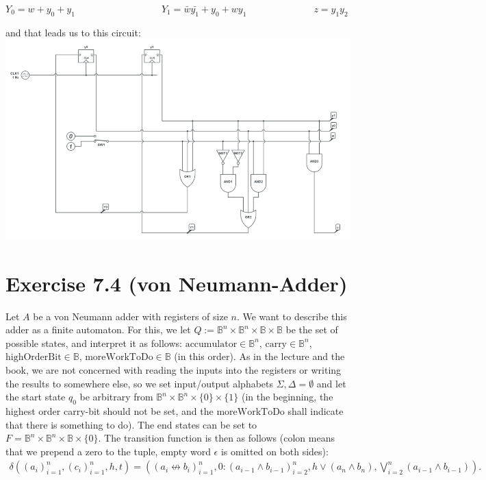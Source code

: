 \documentclass[10pt,a4paper]{scrartcl}
\newcommand{\B}{\mathbb{B}}
\begin{document}
$Y_0=w+y_0+y_1\qquad\qquad\qquad\qquad\quad Y_1=\bar{w}\bar{y_1} + y_0 + wy_1\qquad\qquad\qquad\quad z=y_1y_2$

and that leads us to this circuit:\\
\includegraphics[width=\textwidth]{images/automat.png} 


\FloatBarrier
\section*{Exercise 7.4 (von Neumann-Adder)}
Let $A$ be a von Neumann adder with registers of size $n$.
We want to describe this adder as a finite automaton.
For this, we let $Q:=\B^n\times\B^n\times\B\times\B$ be the set of possible states, 
and interpret it as follows: 
$\textrm{accumulator}\in \B^n$, 
$\textrm{carry}\in \B^n$, 
$\textrm{highOrderBit}\in \B$,
$\textrm{moreWorkToDo}\in \B$ 
(in this order). As in the lecture and the book, we are not concerned with reading
the inputs into the registers or writing the results to somewhere else, so we set
input/output alphabets $\Sigma, \Delta = \emptyset$ and let the start state $q_0$ be
arbitrary from $\B^n\times\B^n\times\{0\}\times\{1\}$ (in the beginning, the highest
order carry-bit should not be set, and the $\textrm{moreWorkToDo}$ shall indicate 
that there is something to do).
The end states can be set to $F=\B^n\times\B^n\times\B\times\{0\}$. 
The transition function is then as follows (colon means that we prepend a zero to the tuple, empty word $\epsilon$ is omitted on both sides):
\begin{align*}
  \delta\left(
    (a_i)_{i=1}^n,
    (c_i)_{i=1}^n,
    h,
    t
  \right) 
  =
  \left(
    (a_i \not\leftrightarrow b_i)_{i=1}^n,
    0 : (a_{i-1} \wedge b_{i-1})_{i=2}^n,
    h \vee (a_n \wedge b_n),
    \bigvee_{i=2}^n(a_{i-1} \wedge b_{i-1})
  \right).
\end{align*}
\end{document}
